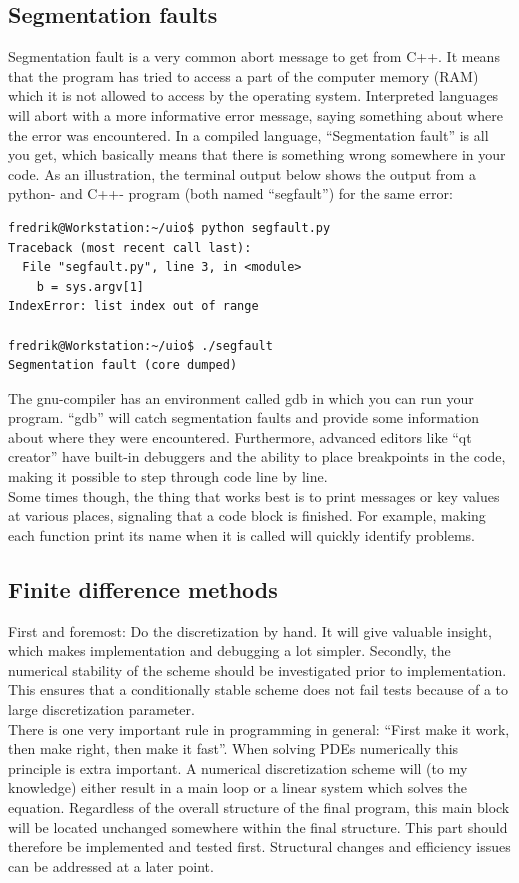 \subsection{Segmentation faults}
Segmentation fault is a very common abort message to get from C++. It means that the program has tried to access a part of the computer memory (RAM) which it is not allowed to access by the operating system. 
Interpreted languages will abort with a more informative error message, saying something about where the error was encountered. 
In a compiled language, ``Segmentation fault'' is all you get, which basically means that there is something wrong somewhere in your code. 
As an illustration, the terminal output below shows the output from a python- and C++- program (both named ``segfault'') for the same error:
\begin{lstlisting}
fredrik@Workstation:~/uio$ python segfault.py 
Traceback (most recent call last):
  File "segfault.py", line 3, in <module>
    b = sys.argv[1]
IndexError: list index out of range

fredrik@Workstation:~/uio$ ./segfault 
Segmentation fault (core dumped)
\end{lstlisting}

The gnu-compiler has an environment called gdb in which you can run your program. 
``gdb'' will catch segmentation faults and provide some information about where they were encountered. 
Furthermore, advanced editors like ``qt creator'' have built-in debuggers and the ability to place breakpoints in the code, making it possible to step through code line by line. \\
Some times though, the thing that works best is to print messages or key values at various places, signaling that a code block is finished. 
For example, making each function print its name when it is called will quickly identify problems. 

\subsection{Finite difference methods}
First and foremost: Do the discretization by hand. 
It will give valuable insight, which makes implementation and debugging a lot simpler. 
Secondly, the numerical stability of the scheme should be investigated prior to implementation. 
This ensures that a conditionally stable scheme does not fail tests because of a to large discretization parameter. \\

\noindent There is one very important rule in programming in general: ``First make it work, then make right, then make it fast''. 
When solving PDEs numerically this principle is extra important. 
A numerical discretization scheme will (to my knowledge) either result in a main loop or a linear system which solves the equation. 
Regardless of the overall structure of the final program, this main block will be located unchanged somewhere within the final structure. 
This part should therefore be implemented and tested first. 
Structural changes and efficiency issues can be addressed at a later point. \\


